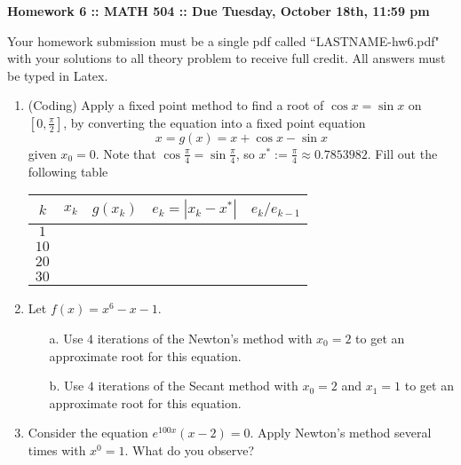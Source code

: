 \documentclass[12pt]{article}
\begin{document}
\vspace{.2 cm}

\begin{center}
{ \bf Homework 6 :: MATH 504 ::  Due Tuesday, October 18th, 11:59 pm} \\[.2in]
\end{center}
Your homework submission must be a single pdf called ``LASTNAME-hw6.pdf" 
with your solutions to all theory problem to receive full credit. All answers must be typed in Latex. 

\begin{enumerate}

\item (Coding)
Apply a fixed point method to find a root of $\cos x= \sin x$ on $[0,\frac{\pi}{2}]$, by converting the equation into a fixed point equation
\[
x = g(x)=x+\cos x -\sin x
\]
given $x_0=0$.  Note that $\cos \frac{\pi}{4}=\sin \frac{\pi}{4}$, so $x^*:=\frac{\pi}{4}\approx 0.7853982$. Fill out the
following table
\begin{center}
\begin{tabular}{|c|c|c|c|c|}
 \hline
$k$  & $x_k$& $g(x_k)$& $e_k = |x_k-x^*|$& $e_k/e_{k-1}$         \\ \hline
$1$& && & \\ \hline
$10$& && & \\ \hline
$20$& && & \\ \hline
$30$& && & \\ \hline
\end{tabular}
\end{center}

\item Let $f(x)=x^6-x-1$.
\begin{itemize}
\item [a.] Use $4$ iterations of the Newton's method with $x_0=2$ to get an approximate 
root for this equation.
\item [b.] Use $4$ iterations of the Secant method with $x_0=2$ and $x_1=1$ to get an 
approximate root for this equation.
\end{itemize}

\item Consider the equation $e^{100x} (x-2)=0$. Apply Newton's method several times with $x^0=1$.
What do you observe?


\end{enumerate}
\end{document}
